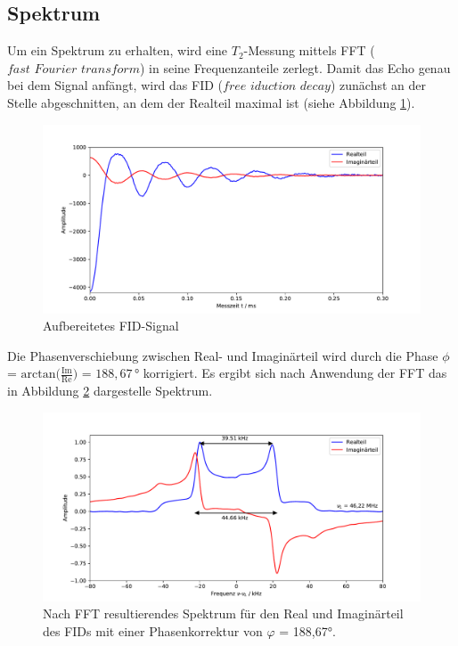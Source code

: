 \subsection{Spektrum}
\label{sec:spek}
Um ein Spektrum zu erhalten, wird eine $T_2$-Messung mittels FFT
($\textit{fast Fourier transform}$) in seine Frequenzanteile zerlegt.
Damit das Echo genau bei dem Signal anfängt, wird das FID
($\textit{free iduction decay}$) zunächst an der Stelle abgeschnitten, an dem der
Realteil maximal ist (siehe Abbildung \ref{fig:fid}).

\begin{figure}[H]
    \centering
    \includegraphics[width=\textwidth]{Auswertung/Spek/FID.pdf}
    \caption{Aufbereitetes FID-Signal}
    \label{fig:fid}
\end{figure}
\noindent
Die Phasenverschiebung zwischen Real- und Imaginärteil wird durch die Phase $\phi$ =
$\text{arctan}\biggl(\frac{\text{Im}}{\text{Re}}\biggr)$ = $188,67\,°$ korrigiert.
Es ergibt sich nach Anwendung der FFT das in Abbildung \ref{fig:spek} dargestelle
Spektrum.

\begin{figure}[H]
    \centering
    \includegraphics[width=\textwidth]{Auswertung/Spek/Spek.pdf}
    \caption{Nach FFT resultierendes Spektrum für den Real und Imaginärteil des
    FIDs mit einer Phasenkorrektur von $\varphi$ = 188,67°.}
    \label{fig:spek}
\end{figure}
